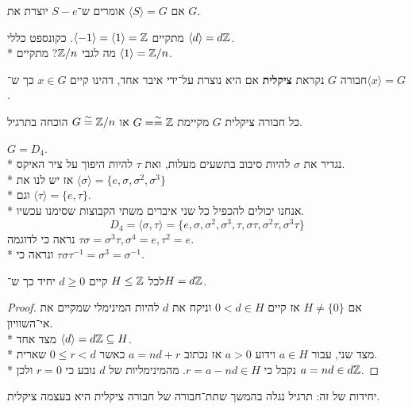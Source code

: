 \begin{definition}
	אם $\langle S \rangle = G$ אומרים ש־$S - e$ יוצרת את $G$.
\end{definition}
\begin{example}
	מתקיים $\langle -1 \rangle = \langle 1 \rangle = \mathbb{Z}$. כקונספט כללי $\langle d \rangle = d\mathbb{Z}$. \\*
	מה לגבי $\mathbb{Z}/n$? מתקיים $\langle 1 \rangle = \mathbb{Z}/n$.
\end{example}
\begin{definition}
	חבורה $G$ נקראת \textbf{ציקלית} אם היא נוצרת על־ידי איבר אחד, דהינו קיים $x \in G$ כך ש־$\langle x \rangle = G$.
\end{definition}
\begin{proposition}
	כל חבורה ציקלית $G$ מקיימת $G = \overset{\sim}{=} \mathbb{Z}$ או $G \overset{\sim}{=} \mathbb{Z}/n$ הוכחה בתרגיל.
\end{proposition}
\begin{example}
	$G = D_4$. \\*
	נגדיר את $\sigma$ להיות סיבוב בתשעים מעלות, ואת $\tau$ להיות היפוך על ציר האיקס. \\*
	אז יש לנו את $\langle \sigma \rangle = \{e, \sigma, \sigma^2, \sigma^3\}$ \\*
	וגם $\langle \tau \rangle = \{e, \tau\}$. \\*
	אנחנו יכולים להכפיל כל שני איברים משתי הקבוצות שסימנו עכשיו.
	\[
		D_4
		= \langle \sigma, \tau \rangle
		= \{e, \sigma, \sigma^2, \sigma^3,
		\tau, \sigma \tau, \sigma^2 \tau, \sigma^3 \tau \}
	\]
	נראה כי לדוגמה $\tau \sigma = \sigma^3 \tau, \sigma^4 = e, \tau^2 = e$. \\*
	ונראה כי $\tau \sigma \tau^{-1} = \sigma^3 = \sigma^{-1}$.
\end{example}
\begin{proposition}[תת־חבורות של Z]
	לכל $H \le \mathbb{Z}$ קיים $d \ge 0$ יחיד כך ש־$H = d \mathbb{Z}$.
\end{proposition}
\begin{proof}
	אם $H \ne \{0\}$ אז קיים $0 < d \in H$ וניקח את $d$ להיות המינימלי שמקיים את אי־השוויון. \\*
	מצד אחד $\langle d \rangle = d \mathbb{Z} \subseteq H$. \\*
	מצד שני, עבור $a \in H$ וידוע $a > 0$ אז נכתוב $a = nd + r$ כאשר $0 \le r < d$ שארית. \\*
	נקבל כי $r = a - nd \in H$. מהמינימליות של $d$ נובע כי $r = 0$ ולכן $a = nd \in d\mathbb{Z}$.
\end{proof}
יחידות של זה: תרגיל
נגלה בהמשך שתת־חבורה של חבורה ציקלית היא בעצמה ציקלית.

